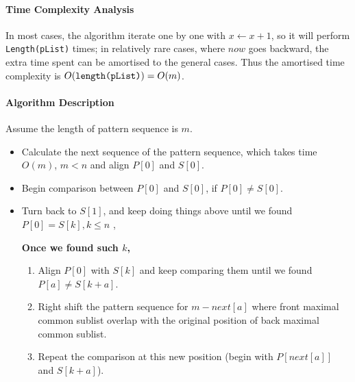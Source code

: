 \begin{questions}
\begin{algorithm}
    \end{algorithm}

    \paragraph{Time Complexity Analysis}
    In most cases, the algorithm iterate one by one with $x\gets x + 1$, so it will perform \texttt{Length(pList)} times; in relatively rare cases, where $now$ goes backward, the extra time spent can be amortised to the general cases. Thus the amortised time complexity is $O(\mbox{\texttt{length(pList)}}) = O(m)$.

    \paragraph{Algorithm Description}Assume the length of pattern sequence is $m$.
    \begin{itemize}
        \item Calculate the next sequence of the pattern sequence, which takes time $O(m)$, $m<n$ and align $P[0]$ and $S[0]$.
        \item Begin comparison between $P[0]$ and $S[0]$, if $P[0]\neq S[0]$.
        \item Turn back to $S[1]$, and keep doing things above until we found $P[0]=S[k], k\leq n$ ,

              \textbf{Once we found such $k$,}
              \begin{enumerate}
                  \item Align $P[0] $ with $S[k]$ and keep comparing them until we found $P[a]\neq S[k+a]$.
                  \item Right shift the pattern sequence for $m-next[a]$ where front maximal common sublist overlap with the original position of back maximal common sublist.
                  \item Repeat the comparison at this new position (begin with $P[next[a]]$ and $S[k+a]$).
              \end{enumerate}


\end{itemize}
\end{questions}
